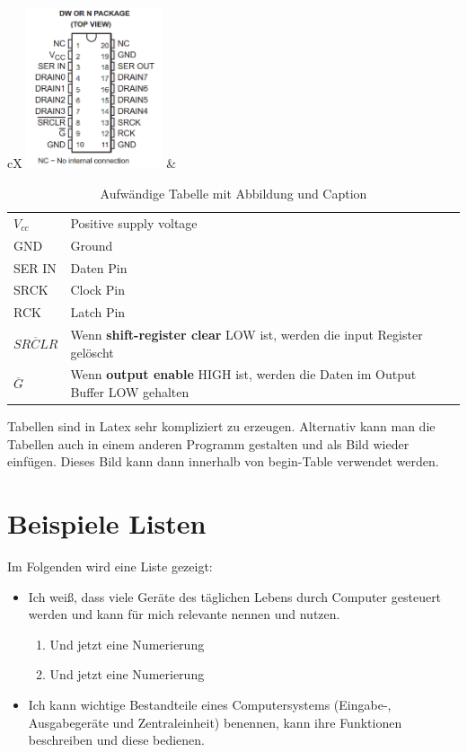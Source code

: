 \begin{table}
     \begin{center}
     \begin{tabularx}{\textwidth}{ cX  } 
      \includegraphics[width=0.3\textwidth]{figures/shift_reg.png}  & 
      {\begin{tabularx}{\cellwidth}{ lX  }      
      $V_{cc}$ & Positive supply voltage\\
      GND & Ground \\
      SER IN & Daten Pin \\
      SRCK & Clock Pin \\
      RCK & Latch Pin \\
      $\overline{SRCLR}$ & Wenn \textbf{shift-register clear} LOW ist, werden die input Register gelöscht\\
      $\overline{G}$ & Wenn \textbf{output enable} HIGH ist, werden die Daten im Output Buffer LOW gehalten
      \end{tabularx}   }
      \end{tabularx}
      \caption{Aufwändige Tabelle mit Abbildung und Caption}
      \label{tbl:shiftReg}
      \end{center}
\end{table}

Tabellen sind in Latex sehr kompliziert zu erzeugen. Alternativ kann man die Tabellen auch in einem anderen Programm gestalten und als Bild wieder einfügen. Dieses Bild kann dann innerhalb von begin-Table verwendet werden.

\section{Beispiele Listen}
Im Folgenden wird eine Liste gezeigt:
\begin{itemize}
  \item Ich weiß, dass viele Geräte des täglichen Lebens durch Computer
  gesteuert werden und kann für mich relevante nennen und nutzen.
  \begin{enumerate}
  	\item Und jetzt eine Numerierung
  	\item Und jetzt eine Numerierung
  \end{enumerate}
  \item Ich kann wichtige Bestandteile eines Computersystems (Eingabe-,
  Ausgabegeräte und Zentraleinheit) benennen, kann ihre Funktionen beschreiben
  und diese bedienen.
\end{itemize}

